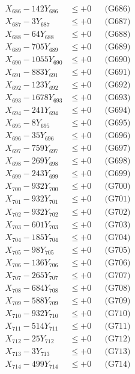 \documentclass[a4paper,10pt]{article}
\begin{document}
{\begin{align}
X_{686} - 142Y_{686} &\leq +0 && \text{(G686)} \\
X_{687} - 3Y_{687} &\leq +0 && \text{(G687)} \\
X_{688} - 64Y_{688} &\leq +0 && \text{(G688)} \\
X_{689} - 705Y_{689} &\leq +0 && \text{(G689)} \\
X_{690} - 1055Y_{690} &\leq +0 && \text{(G690)} \\
\allowbreak
X_{691} - 883Y_{691} &\leq +0 && \text{(G691)} \\
X_{692} - 123Y_{692} &\leq +0 && \text{(G692)} \\
X_{693} - 1678Y_{693} &\leq +0 && \text{(G693)} \\
X_{694} - 241Y_{694} &\leq +0 && \text{(G694)} \\
X_{695} - 8Y_{695} &\leq +0 && \text{(G695)} \\
X_{696} - 35Y_{696} &\leq +0 && \text{(G696)} \\
X_{697} - 759Y_{697} &\leq +0 && \text{(G697)} \\
X_{698} - 269Y_{698} &\leq +0 && \text{(G698)} \\
X_{699} - 243Y_{699} &\leq +0 && \text{(G699)} \\
X_{700} - 932Y_{700} &\leq +0 && \text{(G700)} \\
\allowbreak
X_{701} - 932Y_{701} &\leq +0 && \text{(G701)} \\
X_{702} - 932Y_{702} &\leq +0 && \text{(G702)} \\
X_{703} - 601Y_{703} &\leq +0 && \text{(G703)} \\
X_{704} - 185Y_{704} &\leq +0 && \text{(G704)} \\
X_{705} - 98Y_{705} &\leq +0 && \text{(G705)} \\
X_{706} - 136Y_{706} &\leq +0 && \text{(G706)} \\
X_{707} - 265Y_{707} &\leq +0 && \text{(G707)} \\
X_{708} - 684Y_{708} &\leq +0 && \text{(G708)} \\
X_{709} - 588Y_{709} &\leq +0 && \text{(G709)} \\
X_{710} - 932Y_{710} &\leq +0 && \text{(G710)} \\
\allowbreak
X_{711} - 514Y_{711} &\leq +0 && \text{(G711)} \\
X_{712} - 25Y_{712} &\leq +0 && \text{(G712)} \\
X_{713} - 3Y_{713} &\leq +0 && \text{(G713)} \\
X_{714} - 499Y_{714} &\leq +0 && \text{(G714)} \\

\end{align}}
\end{document}
